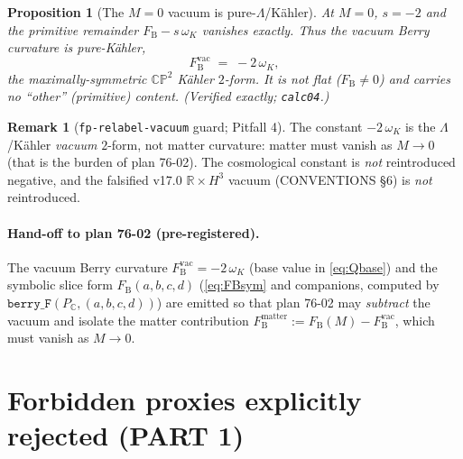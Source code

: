 \documentclass[11pt]{article}
\newcommand{\FB}{F_{\mathrm{B}}}
\theoremstyle{plain}
\newtheorem{proposition}{Proposition}
\theoremstyle{definition}
\newtheorem{remark}{Remark}
\begin{document}
\begin{proposition}[The $M=0$ vacuum is pure-$\Lambda$/K\"ahler]
\label{prop:vacuum}
At $M=0$, $s=-2$ and the primitive remainder $\FB-s\,\omega_K$ vanishes exactly.
Thus the vacuum Berry curvature is pure-K\"ahler,
\begin{equation}
  \FB^{\mathrm{vac}} \;=\; -2\,\omega_K,
\end{equation}
the maximally-symmetric $\mathbb{CP}^2$ K\"ahler $2$-form. It is not flat ($\FB\neq0$)
and carries no ``other'' (primitive) content. (Verified exactly; \texttt{calc04}.)
\end{proposition}

\begin{remark}[\texttt{fp-relabel-vacuum} guard; Pitfall 4]
\label{rem:fprelabel}
The constant $-2\,\omega_K$ is the $\Lambda$/K\"ahler \emph{vacuum} $2$-form, not
matter curvature: matter must vanish as $M\to0$ (that is the burden of plan 76-02).
The cosmological constant is \emph{not} reintroduced negative, and the falsified v17.0
$\mathbb{R}\times H^3$ vacuum (CONVENTIONS \S6) is \emph{not} reintroduced.
\end{remark}

\paragraph{Hand-off to plan 76-02 (pre-registered).} The vacuum Berry curvature
$\FB^{\mathrm{vac}}=-2\,\omega_K$ (base value in \eqref{eq:Qbase}) and the symbolic
slice form $\FB(a,b,c,d)$ (\eqref{eq:FBsym} and companions, computed by
$\texttt{berry\_F}(P_{\mathbb{C}},(a,b,c,d))$) are emitted so that plan 76-02 may
\emph{subtract} the vacuum and isolate the matter contribution
$\FB^{\mathrm{matter}}:=\FB(M)-\FB^{\mathrm{vac}}$, which must vanish as $M\to0$.

\section{Forbidden proxies explicitly rejected (PART 1)}
\label{sec:fp}
\end{document}
